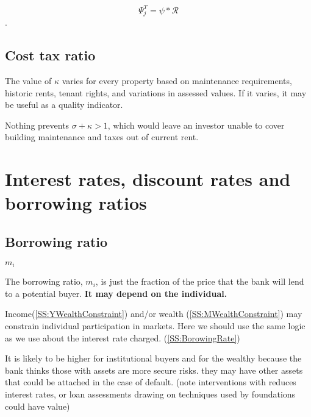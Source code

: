 \[\Psi_j^T = \psi * \mathcal{R}\].  




\subsection{Cost tax ratio}\label{SS:CostRatio} 
The value of $\kappa$  varies for every property based on maintenance requirements, historic rents, tenant rights, and variations in assessed values. If it varies, it may be useful as a quality indicator.


Nothing prevents $\sigma+\kappa >1$, which would leave an investor unable to cover building maintenance and taxes out of current rent. 



\section{Interest rates, discount rates and borrowing ratios} \label{SS:RatesAndRatios}

\subsection{Borrowing ratio} \label{SS:BorrowingRatio}
$m_i$

The borrowing ratio, $m_i$, is just the fraction of the price that the bank will lend to a potential buyer. \textbf{It may depend on the individual.} 

Income(\ref{SS:YWealthConstraint}) and/or wealth (\ref {SS:MWealthConstraint}) may constrain individual participation in markets. 
Here we should use the same logic as we use about the interest rate charged. (\ref{SS:BorowingRate})

It is likely to be higher for institutional buyers  and for the wealthy because the bank thinks those with assets are more secure risks. they may have other assets that could be attached in the case of default.
(note interventions with reduces interest rates, or loan assessments drawing on techniques used by foundations could have value)


